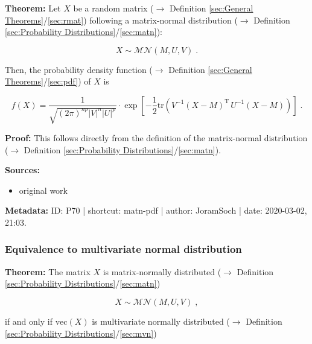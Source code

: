 \documentclass[a4paper,12pt,twoside]{book}
\begin{document}
\textbf{Theorem:} Let $X$ be a random matrix ($\rightarrow$ Definition \ref{sec:General Theorems}/\ref{sec:rmat}) following a matrix-normal distribution ($\rightarrow$ Definition \ref{sec:Probability Distributions}/\ref{sec:matn}):

\begin{equation} \label{eq:matn-pdf-matn}
X \sim \mathcal{MN}(M, U, V) \; .
\end{equation}

Then, the probability density function ($\rightarrow$ Definition \ref{sec:General Theorems}/\ref{sec:pdf}) of $X$ is

\begin{equation} \label{eq:matn-pdf-matn-pdf}
f(X) = \frac{1}{\sqrt{(2\pi)^{np} |V|^n |U|^p}} \cdot \exp\left[-\frac{1}{2} \mathrm{tr}\left( V^{-1} (X-M)^\mathrm{T} \, U^{-1} (X-M) \right) \right] \; .
\end{equation}


\vspace{1em}
\textbf{Proof:} This follows directly from the definition of the matrix-normal distribution ($\rightarrow$ Definition \ref{sec:Probability Distributions}/\ref{sec:matn}).


\vspace{1em}
\textbf{Sources:}
\begin{itemize}
\item original work\end{itemize}


\vspace{1em}
\textbf{Metadata:} ID: P70 | shortcut: matn-pdf | author: JoramSoch | date: 2020-03-02, 21:03.
\vspace{1em}



\subsubsection[\textbf{Equivalence to multivariate normal distribution}]{Equivalence to multivariate normal distribution} \label{sec:matn-mvn}
\setcounter{equation}{0}

\textbf{Theorem:} The matrix $X$ is matrix-normally distributed ($\rightarrow$ Definition \ref{sec:Probability Distributions}/\ref{sec:matn})

\begin{equation} \label{eq:matn-mvn-matn}
X \sim \mathcal{MN}(M, U, V) \; ,
\end{equation}

if and only if $\mathrm{vec}(X)$ is multivariate normally distributed ($\rightarrow$ Definition \ref{sec:Probability Distributions}/\ref{sec:mvn})
\end{document}
